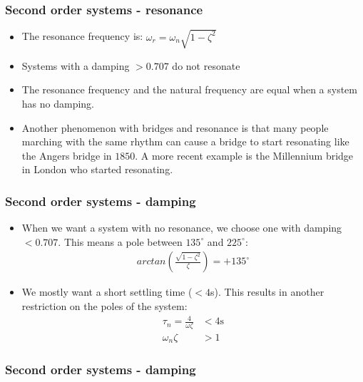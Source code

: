 \begin{frame}
\frametitle{Second order systems - resonance}
\begin{itemize}
\item The resonance frequency is: $\omega_r = \omega_n\sqrt{1-\zeta^2}$
\vspace{0.15cm}
\item Systems with a damping $>0.707$ do not resonate
\vspace{0.15cm}
\item The resonance frequency and the natural frequency are equal when a system has no damping.
\vspace{0.15cm}
\item Another phenomenon with bridges and resonance is that many people marching with the same rhythm can cause a bridge to start resonating like the Angers bridge in $1850$. A more recent example is the Millennium bridge in London who started resonating.
\end{itemize}
\end{frame}

\begin{frame}
\frametitle{Second order systems - damping}
\begin{itemize}
\item When we want a system with no resonance, we choose one with damping $<0.707$. This means a pole between $135^{\circ}$ and $225^{\circ}$:
\\ 
\begin{align*}
arctan(\frac{\sqrt{1-\zeta^2}}{\zeta}) = +135^{\circ}
\end{align*}
\item We mostly want a short settling time ($<4$s). This results in another restriction on the poles of the system: 
\\ \begin{align*}
\tau_n= \frac{4}{\omega\zeta}&< 4\text{s}
\\ \omega_n\zeta&>1
\end{align*}
\end{itemize}
\end{frame}

\begin{frame}
\frametitle{Second order systems - damping}
\begin{figure}
\end{figure}
\end{frame}



